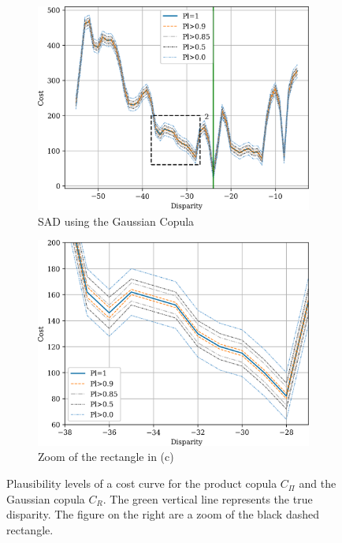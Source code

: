 \begin{figure}
    \begin{subfigure}{0.48\linewidth}
        \centering
        \includegraphics[width=\linewidth]{Images/Chap_4/bel_100_120.png}
        \caption{SAD using the Gaussian Copula}
        \label{fig:belief_gaussian}
    \end{subfigure}\hfill
    \begin{subfigure}{0.48\linewidth}
        \centering
        \includegraphics[width=\linewidth]{Images/Chap_4/bel_100_120_zoom.png}
        \caption{Zoom of the rectangle in (c)}
        \label{fig:belief_gaussian_zoom}
    \end{subfigure}
    \caption{Plausibility levels of a cost curve for the product copula $C_\Pi$ and the Gaussian copula $C_R$. The green vertical line represents the true disparity. The figure on the right are a zoom of the black dashed rectangle.}
    \label{fig:belief_curves}
\end{figure}

